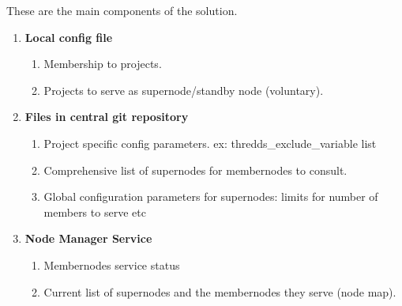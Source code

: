 \documentclass[oneside,12pt]{memoir}
\begin{document}
These are the main components of the solution.
\begin{enumerate}
\item
\textbf{Local config file} 
\begin{enumerate}
\item Membership to projects.
\item Projects to serve as supernode/standby node (voluntary).


\end{enumerate}





\item \textbf{Files in central git repository}
\begin{enumerate}
\item Project specific config parameters. ex: thredds\_exclude\_variable list
\item Comprehensive list of supernodes for membernodes to consult.
\item Global configuration parameters for supernodes: limits for number of members to serve etc
\end{enumerate}
\item \textbf{Node Manager Service}
\begin{enumerate}
\item Membernodes service status
\item Current list of supernodes and the membernodes they serve (node map).
\end{enumerate}


\end{enumerate}
\end{document}
